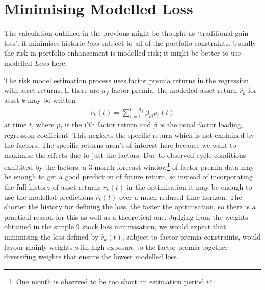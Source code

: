 \documentclass[12pt]{article}
\begin{document}
\section{Minimising Modelled Loss}
The calculation outlined in the previous might be thought as $`$traditional gain loss'; it
minimises historic $loss$ subject to all of the portfolio constraints. Usually the risk in 
portfolio enhancement is modelled risk; it might be better to use modelled $Loss$ here.

The risk model estimation process uses factor premia returns in the regression
with asset returns. If there are $n_f$ factor premia, the modelled asset return $\hat{r}_{k}$ for asset $k$ may be written
\begin{eqnarray}
    \hat{r}_{k}(t) = \sum_{i=1}^{i=n_f}\beta_{ki} p_{i}(t)
\end{eqnarray}
at time $t$, where $p_i$ is the i'th factor return and $\beta$ is the usual factor loading, regression coefficient.
This neglects the specific return which is not explained by the factors. The specific returns aren't of interest here because we want 
to maximise the effects due to just the factors.
Due to observed cycle conditions exhibited by the factors, a 3 month forecast window\footnote{One month is observed to be too short an estimation period.} of factor premia data may be enough
to get a good prediction of future return, so instead of incorporating the full history of
asset returns $r_k(t)$ in the optimisation it may be enough to use the modelled predictions
$\hat{r}_{k}(t)$ over a much reduced time horizon. The shorter the history for defining the
loss, the faster the optimisation, so there is a practical reason for this as well as
a theoretical one. Judging from the weights obtained in the simple 9 stock loss minimisation, we would expect 
that minimising the loss defined by $\hat{r}_{k}(t)$, subject to factor premia constraints, would favour mainly weights 
with high exposure to the factor premia together diversifing weights that ensure the lowest modelled loss.
\end{document}
